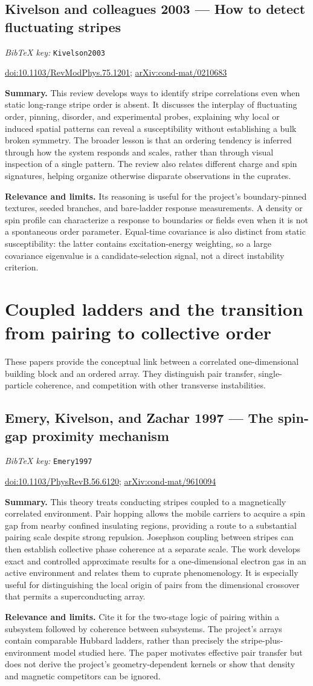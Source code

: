 \documentclass[11pt]{article}
\newcommand{\paper}[2]{\Needspace{8\baselineskip}\subsection{#2}\label{paper:#1}\textit{BibTeX key:} \texttt{#1}\quad\citep{#1}\par}
\newcommand{\doi}[1]{\href{https://doi.org/#1}{doi:#1}}
\newcommand{\arxiv}[1]{\href{https://arxiv.org/abs/#1}{arXiv:#1}}
\newcommand{\summary}{\par\textbf{Summary.} }
\newcommand{\relevance}{\par\textbf{Relevance and limits.} }
\begin{document}
\paper{Kivelson2003}{Kivelson and colleagues 2003 --- How to detect fluctuating stripes}
\doi{10.1103/RevModPhys.75.1201}; \arxiv{cond-mat/0210683}
\summary This review develops ways to identify stripe correlations even when static long-range stripe order is absent. It discusses the interplay of fluctuating order, pinning, disorder, and experimental probes, explaining why local or induced spatial patterns can reveal a susceptibility without establishing a bulk broken symmetry. The broader lesson is that an ordering tendency is inferred through how the system responds and scales, rather than through visual inspection of a single pattern. The review also relates different charge and spin signatures, helping organize otherwise disparate observations in the cuprates.
\relevance Its reasoning is useful for the project's boundary-pinned textures, seeded branches, and bare-ladder response measurements. A density or spin profile can characterize a response to boundaries or fields even when it is not a spontaneous order parameter. Equal-time covariance is also distinct from static susceptibility: the latter contains excitation-energy weighting, so a large covariance eigenvalue is a candidate-selection signal, not a direct instability criterion.

\section{Coupled ladders and the transition from pairing to collective order}
These papers provide the conceptual link between a correlated one-dimensional building block and an ordered array. They distinguish pair transfer, single-particle coherence, and competition with other transverse instabilities.

\paper{Emery1997}{Emery, Kivelson, and Zachar 1997 --- The spin-gap proximity mechanism}
\doi{10.1103/PhysRevB.56.6120}; \arxiv{cond-mat/9610094}
\summary This theory treats conducting stripes coupled to a magnetically correlated environment. Pair hopping allows the mobile carriers to acquire a spin gap from nearby confined insulating regions, providing a route to a substantial pairing scale despite strong repulsion. Josephson coupling between stripes can then establish collective phase coherence at a separate scale. The work develops exact and controlled approximate results for a one-dimensional electron gas in an active environment and relates them to cuprate phenomenology. It is especially useful for distinguishing the local origin of pairs from the dimensional crossover that permits a superconducting array.
\relevance Cite it for the two-stage logic of pairing within a subsystem followed by coherence between subsystems. The project's arrays contain comparable Hubbard ladders, rather than precisely the stripe-plus-environment model studied here. The paper motivates effective pair transfer but does not derive the project's geometry-dependent kernels or show that density and magnetic competitors can be ignored.
\end{document}
